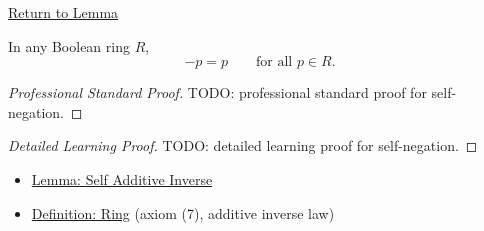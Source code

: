 \newpage
{}
\label{prf:self-negation}

\begin{remark*}[Return]
\hyperref[lem:self-negation]{Return to Lemma}

\end{remark*}

\begin{lemma*}
In any Boolean ring $R$,
\[
-p = p \qquad \text{for all } p \in R.
\]
\end{lemma*}

\begin{proof}[Professional Standard Proof]
\LRAProofBodyStart
TODO: professional standard proof for self-negation.
\end{proof}

\begin{proof}[Detailed Learning Proof]
\LRAProofBodyStart
TODO: detailed learning proof for self-negation.
\end{proof}

\begin{remark*}
\end{remark*}

\begin{dependencies}
\begin{itemize}
  \item \hyperref[lem:self-additive-inverse]{Lemma: Self Additive Inverse}
  \item \hyperref[def:algebraic-ring]{Definition: Ring} (axiom (7), additive inverse law)
\end{itemize}
\end{dependencies}

\clearpage

